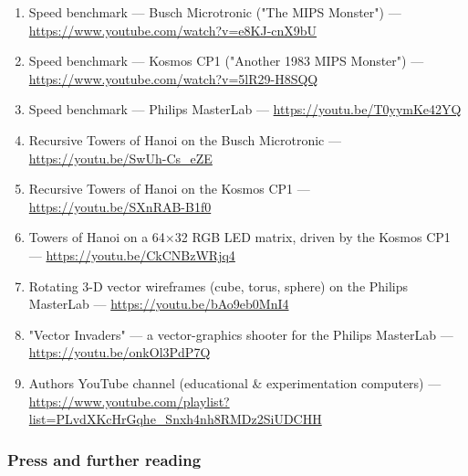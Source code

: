 \documentclass[
  11pt,
  letterpaper,
]{article}
\providecommand{\tightlist}{%
  \setlength{\itemsep}{0pt}\setlength{\parskip}{0pt}}
\begin{document}
\begin{enumerate}
\def\labelenumi{\arabic{enumi}.}
\setcounter{enumi}{36}
\tightlist
\item
  Speed benchmark --- Busch Microtronic ("The MIPS Monster") ---
  \url{https://www.youtube.com/watch?v=e8KJ-cnX9bU}
\item
  Speed benchmark --- Kosmos CP1 ("Another 1983 MIPS Monster") ---
  \url{https://www.youtube.com/watch?v=5lR29-H8SQQ}
\item
  Speed benchmark --- Philips MasterLab ---
  \url{https://youtu.be/T0yymKe42YQ}
\item
  Recursive Towers of Hanoi on the Busch Microtronic ---
  \url{https://youtu.be/SwUh-Cs_eZE}
\item
  Recursive Towers of Hanoi on the Kosmos CP1 ---
  \url{https://youtu.be/SXnRAB-B1f0}
\item
  Towers of Hanoi on a 64×32 RGB LED matrix, driven by the Kosmos CP1
  --- \url{https://youtu.be/CkCNBzWRjq4}
\item
  Rotating 3-D vector wireframes (cube, torus, sphere) on the Philips
  MasterLab --- \url{https://youtu.be/bAo9eb0MnI4}
\item
  "Vector Invaders" --- a vector-graphics shooter for the Philips
  MasterLab --- \url{https://youtu.be/onkOl3PdP7Q}
\item
  Author\textquotesingle s YouTube channel (educational \&
  experimentation computers) ---
  \url{https://www.youtube.com/playlist?list=PLvdXKcHrGqhe_Snxh4nh8RMDz2SiUDCHH}
\end{enumerate}

\subsubsection{Press and further
reading}\label{press-and-further-reading}
\end{document}
